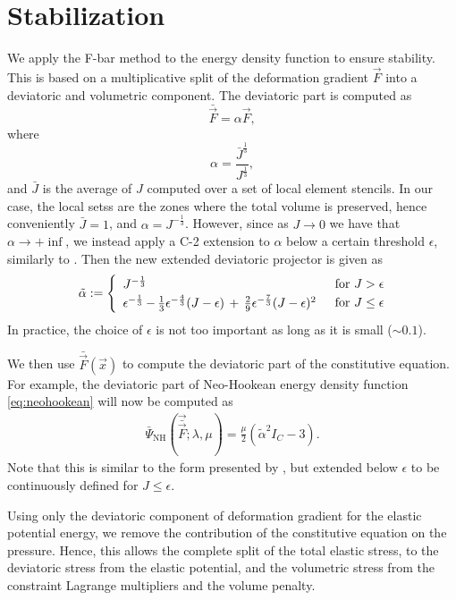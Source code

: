 \section{Stabilization}
We apply the F-bar method \cite{neto:2005} to the energy density function to ensure stability. 
This is based on a multiplicative split of the deformation gradient $\vec{F}$ into 
a deviatoric and volumetric component. The deviatoric part is computed as
\begin{equation}
\bar{\vec{F}}= \alpha \vec{F},
\label{eq:F-bar}
\end{equation}
where
\begin{equation}
\alpha = \frac{\bar{J}^{\frac{1}{3}}}{J^{\frac{1}{3}}},
\label{eq:F-bar_alpha}
\end{equation}
and $\bar{J}$ is the average of $J$ computed over a set of local element stencils. In our case, the
local setss are the zones where the total volume is preserved, hence conveniently 
$\bar{J} = 1$, and $\alpha = J^{-\frac{1}{3}}$. However, since as $J \rightarrow 0$ we have that $\alpha \rightarrow +\inf$, we instead apply a C-2 extension to $\alpha$ below a certain threshold $\epsilon$, similarly to \cite{Stomakhin:2012}. Then the new extended deviatoric projector is given as
\begin{align}
\tilde{\alpha} := 
\begin{cases}
\begin{array}{l} J^{-\frac{1}{3}} \end{array}  & \text{for } J > \epsilon\\
\begin{array}{l@{}l}
\epsilon^{-\frac{1}{3}} &\,-\, \frac{1}{3} \epsilon^{-\frac{4}{3}} (J - \epsilon)
\,+\, \frac{2}{9} \epsilon^{-\frac{7}{3}} (J - \epsilon)^2
\end{array} & \text{for } J \leq \epsilon
\end{cases}
\label{eq:c2}
\end{align}
In practice, the choice of $\epsilon$ is not too important as long as it is small ($\sim 0.1$). 

We then use $\bar{\vec{F}}(\vec{x})$ to compute the deviatoric part of the constitutive equation. For example, 
the deviatoric part of Neo-Hookean energy density function \eqref{eq:neohookean} will now be computed as
\begin{align}
\bar{\Psi}_{\text{NH}}(\vec{\bar{\vec{F}}}; \lambda, \mu) = \frac{\mu}{2}(\tilde{\alpha}^2 I_C - 3).
\label{eq:deviatoric_neohookean}
\end{align}
Note that this is similar to the form presented by \cite{Rivlin:1948}, but extended below 
$\epsilon$ to be continuously defined for $J \leq \epsilon$. 

Using only the deviatoric component of deformation gradient for the elastic potential energy, we remove the contribution of the constitutive equation on the pressure. Hence, this allows the complete split of the total elastic stress, to the deviatoric stress from the elastic potential, and the volumetric stress from the constraint Lagrange multipliers and the volume penalty.